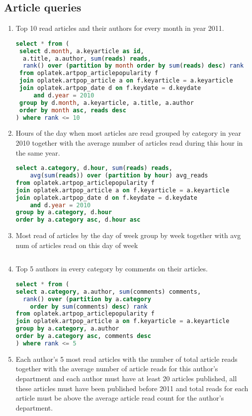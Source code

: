 \subsection*{Article queries} %
\label{sub:Article  queries}
\begin{enumerate}
\item    Top 10 read articles and their authors for every month in year 2011.
\begin{lstlisting}[language=sql] 
select * from (
 select d.month, a.keyarticle as id, 
  a.title, a.author, sum(reads) reads, 
  rank() over (partition by month order by sum(reads) desc) rank 
 from oplatek.artpop_articlepopularity f
 join oplatek.artpop_article a on f.keyarticle = a.keyarticle
 join oplatek.artpop_date d on f.keydate = d.keydate 
     and d.year = 2010
 group by d.month, a.keyarticle, a.title, a.author
 order by month asc, reads desc
) where rank <= 10
\end{lstlisting}
\item    Hours of the day when most articles are read grouped by category in year 2010 together with the average number of articles read during this hour in the same year.
\begin{lstlisting}[language=sql] 
select a.category, d.hour, sum(reads) reads, 
    avg(sum(reads)) over (partition by hour) avg_reads 
from oplatek.artpop_articlepopularity f
join oplatek.artpop_article a on f.keyarticle = a.keyarticle
join oplatek.artpop_date d on f.keydate = d.keydate 
    and d.year = 2010
group by a.category, d.hour
order by a.category asc, d.hour asc
\end{lstlisting}
\item    Most read of articles by the day of week group by week together with avg num of articles read on this day of week
\begin{lstlisting}[language=sql] 
\end{lstlisting}
\item    Top 5 authors in every category by comments on their articles.
\begin{lstlisting}[language=sql] 
select * from (
select a.category, a.author, sum(comments) comments, 
  rank() over (partition by a.category 
    order by sum(comments) desc) rank 
from oplatek.artpop_articlepopularity f
join oplatek.artpop_article a on f.keyarticle = a.keyarticle
group by a.category, a.author
order by a.category asc, comments desc
) where rank <= 5
\end{lstlisting}
\item    Each author's 5 most read articles with the number of total article reads together with the average number of article reads for this author's department and each author must have at least 20 articles published, all these articles must have been published before 2011 and total reads for each article must be above the average article read count for the author's department.

\end{enumerate}
